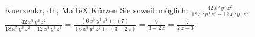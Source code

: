 \begin{MAufgabe}{Kuerzen}{kr, dh, MaTeX}
K\"urzen Sie soweit m\"oglich: $\frac{42\, x^5\, y^3\, z^2}{18\, x^5\, y^3\, z^2 - 12\, x^5\, y^3\, z^3}$.\\ 
\ifLsg\MLoesung
\quad $\frac{42\, x^5\, y^3\, z^2}{18\, x^5\, y^3\, z^2 - 12\, x^5\, y^3\, z^3}=\frac{(6\, x^5\, y^3\, z^2)\cdot(7)}{(6\, x^5\, y^3\, z^2)\cdot(3 - 2\, z)}=\frac{7}{3 - 2\, z}=\frac{-7}{2\, z - 3}$.\else\relax\fi
 \end{MAufgabe}